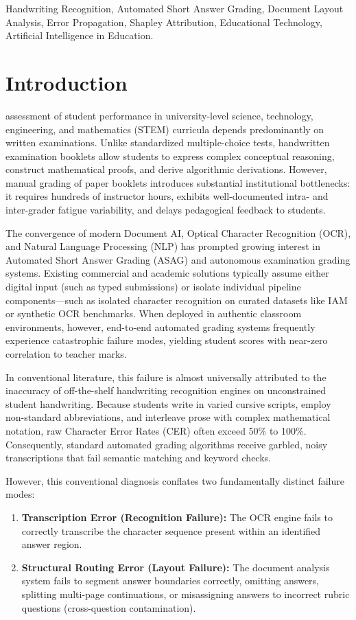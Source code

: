 \documentclass[journal]{IEEEtran}
\begin{document}
\begin{IEEEkeywords}
Handwriting Recognition, Automated Short Answer Grading, Document Layout Analysis, Error Propagation, Shapley Attribution, Educational Technology, Artificial Intelligence in Education.
\end{IEEEkeywords}

\section{Introduction}
 assessment of student performance in university-level science, technology, engineering, and mathematics (STEM) curricula depends predominantly on written examinations. Unlike standardized multiple-choice tests, handwritten examination booklets allow students to express complex conceptual reasoning, construct mathematical proofs, and derive algorithmic derivations. However, manual grading of paper booklets introduces substantial institutional bottlenecks: it requires hundreds of instructor hours, exhibits well-documented intra- and inter-grader fatigue variability, and delays pedagogical feedback to students.

The convergence of modern Document AI, Optical Character Recognition (OCR), and Natural Language Processing (NLP) has prompted growing interest in Automated Short Answer Grading (ASAG) and autonomous examination grading systems. Existing commercial and academic solutions typically assume either digital input (such as typed submissions) or isolate individual pipeline components---such as isolated character recognition on curated datasets like IAM \cite{marti2002iam} or synthetic OCR benchmarks. When deployed in authentic classroom environments, however, end-to-end automated grading systems frequently experience catastrophic failure modes, yielding student scores with near-zero correlation to teacher marks.

In conventional literature, this failure is almost universally attributed to the inaccuracy of off-the-shelf handwriting recognition engines on unconstrained student handwriting. Because students write in varied cursive scripts, employ non-standard abbreviations, and interleave prose with complex mathematical notation, raw Character Error Rates (CER) often exceed 50\% to 100\%. Consequently, standard automated grading algorithms receive garbled, noisy transcriptions that fail semantic matching and keyword checks.

However, this conventional diagnosis conflates two fundamentally distinct failure modes:
\begin{enumerate}
    \item \textbf{Transcription Error (Recognition Failure):} The OCR engine fails to correctly transcribe the character sequence present within an identified answer region.
    \item \textbf{Structural Routing Error (Layout Failure):} The document analysis system fails to segment answer boundaries correctly, omitting answers, splitting multi-page continuations, or misassigning answers to incorrect rubric questions (cross-question contamination).
\end{enumerate}
\end{document}
